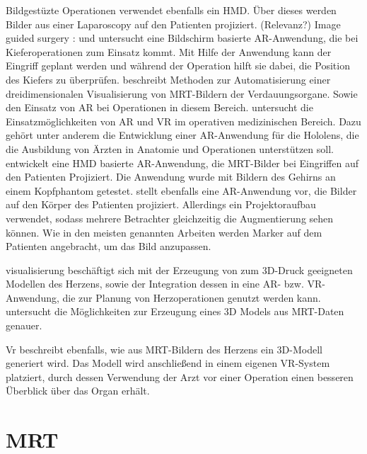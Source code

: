 Bildgestüzte Operationen 
\cite{fuchs98} verwendet ebenfalls ein HMD. Über dieses werden Bilder aus einer Laparoscopy auf den Patienten projiziert. (Relevanz?)
Image guided surgery :\cite{grimson99} und  \cite{KerstenOertel2013TheSO}
\cite{MISCHKOWSKI2006478}
\cite{MISCHKOWSKI2006478} untersucht eine Bildschirm basierte AR-Anwendung, die bei Kieferoperationen zum Einsatz kommt. Mit Hilfe der Anwendung kann der Eingriff geplant werden und während der Operation hilft sie dabei, die Position des Kiefers zu überprüfen. 
\cite{Soler04} beschreibt Methoden zur Automatisierung einer dreidimensionalen Visualisierung von MRT-Bildern der Verdauungsorgane. Sowie den Einsatz von AR bei Operationen in diesem Bereich. 
\cite{GasquesRodrigues17} untersucht die Einsatzmöglichkeiten von AR und VR im operativen medizinischen Bereich. Dazu gehört unter anderem die Entwicklung einer AR-Anwendung für die Hololens, die die Ausbildung von Ärzten in Anatomie und Operationen unterstützen soll. 
\cite{Wendt03} entwickelt eine HMD basierte AR-Anwendung, die MRT-Bilder bei Eingriffen auf den Patienten Projiziert. Die Anwendung wurde mit Bildern des Gehirns an einem Kopfphantom getestet.
\cite{Watts17} stellt ebenfalls eine AR-Anwendung vor, die Bilder auf den Körper des Patienten projiziert. Allerdings ein Projektoraufbau verwendet, sodass mehrere Betrachter gleichzeitig die Augmentierung sehen können. Wie in den meisten genannten Arbeiten werden Marker auf dem Patienten angebracht, um das Bild anzupassen.


visualisierung
\cite{Mangina17} beschäftigt sich mit der Erzeugung von zum 3D-Druck geeigneten Modellen des Herzens, sowie der Integration dessen in eine AR- bzw. VR-Anwendung, die zur Planung von Herzoperationen genutzt werden kann.
\cite{Mangina17_2} untersucht die Möglichkeiten zur Erzeugung eines 3D Models aus MRT-Daten genauer.

Vr 
\cite{SORENSEN2001193} beschreibt ebenfalls, wie aus MRT-Bildern des Herzens ein 3D-Modell generiert wird. Das Modell wird anschließend in einem eigenen VR-System platziert, durch dessen Verwendung der Arzt vor einer Operation einen besseren Überblick über das Organ erhält.


\section{MRT}
\label{mrt}												 %

